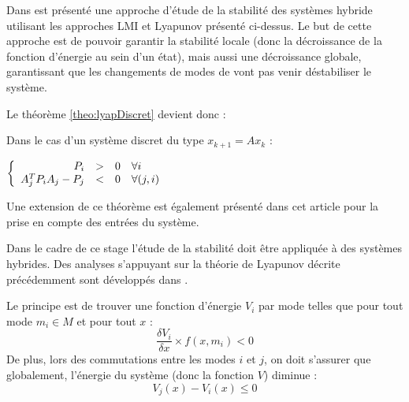 Dans \cite{mignone_stability_2000} est présenté une approche d'étude de la stabilité des systèmes hybride utilisant les approches LMI et Lyapunov présenté ci-dessus. Le but de cette approche est de pouvoir garantir la stabilité locale (donc la décroissance de la fonction d'énergie au sein d'un état), mais aussi une décroissance globale, garantissant que les changements de modes de vont pas venir déstabiliser le système.

Le théorème \ref{theo:lyapDiscret} devient donc : 
\begin{theo}
	Dans le cas d'un système discret du type $x_{k+1} = Ax_k$ :
	\begin{center}
		$   \left \{
		\begin{array}{r c l l}
		P_i & > & 0 & \forall i\\
		A_j^TP_iA_j - P_j & < & 0 & \forall (j,i)
		\end{array}
		\right. $
	\end{center}
	\label{theo:lyapDiscretHybride}
\end{theo}

Une extension de ce théorème est également présenté dans cet article pour la prise en compte des entrées du système.

\label{subsubsec:stabHybride}
Dans le cadre de ce stage l'étude de la stabilité doit être appliquée à des systèmes hybrides. Des analyses s'appuyant sur la théorie de Lyapunov décrite précédemment sont développés dans \cite{shorten_stability_2007}\cite{oehlerking_decomposition_2011}.

Le principe est de trouver une fonction d'énergie $V_i$ par mode telles que pour tout mode $m_i \in M$ et pour tout $x$ : 
\[ \frac{\delta V_i}{\delta x} \times f(x,m_i) < 0\]
De plus, lors des commutations entre les modes $i$ et $j$, on doit s'assurer que globalement, l'énergie du système (donc la fonction $V$) diminue : 
\[ V_j(x)-V_i(x) \leq 0 \]

